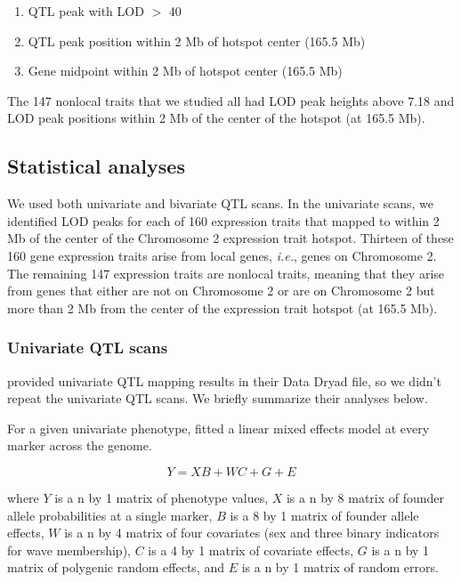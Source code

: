 \documentclass{article}
\begin{document}
\begin{boehm}
\begin{enumerate}
    \item QTL peak with LOD $>$ 40
    \item QTL peak position within 2 Mb of hotspot center (165.5 Mb)
    \item Gene midpoint within 2 Mb of hotspot center (165.5 Mb)
\end{enumerate}

The 147 nonlocal traits that we studied all had LOD peak heights above 7.18 and LOD peak positions within 2 Mb of the center of the hotspot (at 165.5 Mb).



\subsection{Statistical analyses}

We used both univariate and bivariate QTL scans. In the univariate scans, we identified LOD peaks for each of 160 expression traits that mapped to within 2 Mb of the center of the Chromosome 2 expression trait hotspot. Thirteen of these 160 gene expression traits arise from local genes, \emph{i.e.}, genes on Chromosome 2. The remaining 147 expression traits are nonlocal traits, meaning that they arise from genes that either are not on Chromosome 2 or are on Chromosome 2 but more than 2 Mb from the center of the expression trait hotspot (at 165.5 Mb).




\subsubsection{Univariate QTL scans}

\citet{keller2018genetic} provided univariate QTL mapping results in their Data Dryad file, so we didn't repeat the univariate QTL scans. We briefly summarize their analyses below.

For a given univariate phenotype, \citet{keller2018genetic} fitted a linear mixed effects model at every marker across the genome.

\begin{equation}
    Y = XB + WC + G + E
    \label{eqn:uni-lmm}
\end{equation}

where $Y$ is a n by 1 matrix of phenotype values, $X$ is a n by 8 matrix of founder allele probabilities at a single marker, $B$ is a 8 by 1 matrix of founder allele effects, $W$ is a n by 4 matrix of four covariates (sex and three binary indicators for wave membership), $C$ is a 4 by 1 matrix of covariate effects, $G$ is a n by 1 matrix of polygenic random effects, and $E$ is a n by 1 matrix of random errors.


\end{boehm}
\end{document}
